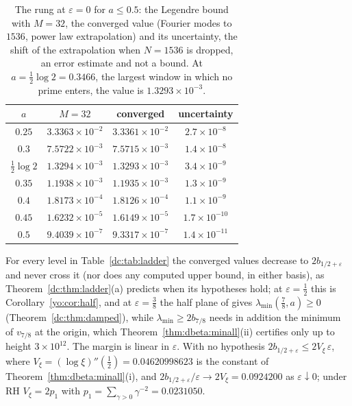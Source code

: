 \begin{table}[ht]
\centering\small
\begin{tabular}{@{}cccc@{}}
\toprule
$a$ & $M=32$ & converged & uncertainty\\
\midrule
$0.25$ & $3.3363\times10^{-2}$ & $3.3361\times10^{-2}$ & $2.7\times10^{-8}$\\
$0.3$ & $7.5722\times10^{-3}$ & $7.5715\times10^{-3}$ & $1.4\times10^{-8}$\\
$\frac12\log2$ & $1.3294\times10^{-3}$ & $1.3293\times10^{-3}$ & $3.4\times10^{-9}$\\
$0.35$ & $1.1938\times10^{-3}$ & $1.1935\times10^{-3}$ & $1.3\times10^{-9}$\\
$0.4$ & $1.8173\times10^{-4}$ & $1.8126\times10^{-4}$ & $1.1\times10^{-9}$\\
$0.45$ & $1.6232\times10^{-5}$ & $1.6149\times10^{-5}$ & $1.7\times10^{-10}$\\
$0.5$ & $9.4039\times10^{-7}$ & $9.3317\times10^{-7}$ & $1.4\times10^{-11}$\\
\bottomrule
\end{tabular}
\caption{The rung at $\varepsilon=0$ for $a\le0.5$: the Legendre bound with $M=32$, the converged value (Fourier modes to $1536$, power law extrapolation) and its uncertainty, the shift of the extrapolation when $N=1536$ is dropped, an error estimate and not a bound. At $a=\frac12\log2=0.3466$, the largest window in which no prime enters, the value is $1.3293\times10^{-3}$.}
\label{dc:tab:zero}
\end{table}

For every level in Table~\ref{dc:tab:ladder} the converged values decrease to $2b_{1/2+\varepsilon}$ and never cross it (nor does any computed upper bound, in either basis), as Theorem~\ref{dc:thm:ladder}(a) predicts when its hypotheses hold; at $\varepsilon=\frac12$ this is Corollary~\ref{yo:cor:half}, and at $\varepsilon=\frac38$ the half plane of \cite{OAI26a} gives $\lambda_{\min}(\frac78,a)\ge0$ (Theorem~\ref{dc:thm:damped}), while $\lambda_{\min}\ge2b_{7/8}$ needs in addition the minimum of $v_{7/8}$ at the origin, which Theorem~\ref{thm:dbeta:minall}(ii) certifies only up to height $3\times10^{12}$. The margin is linear in $\varepsilon$. With no hypothesis $2b_{1/2+\varepsilon}\le2V_\xi\,\varepsilon$, where $V_\xi=(\log\xi)''(\frac12)=0.04620998623$ is the constant of Theorem~\ref{thm:dbeta:minall}(i), and $2b_{1/2+\varepsilon}/\varepsilon\to2V_\xi=0.0924200$ as $\varepsilon\downarrow0$; under RH $V_\xi=2p_1$ with $p_1=\sum_{\gamma>0}\gamma^{-2}=0.0231050$.

